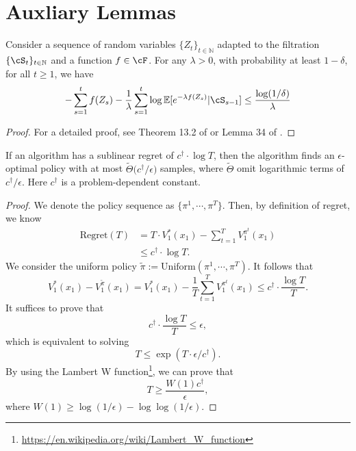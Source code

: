 \documentclass[11pt]{article}
\newcommand{\E}{\mathbb E}
\begin{document}
\section{Auxliary Lemmas}

\begin{lemma}\label{lm:th13_9}
Consider a sequence of random variables $\{Z_t\}_{t\in\mathbb N}$ adapted to the filtration $\{\cS_t\}_{t\in\mathbb N}$ and a function $f\in\cF$. For any $\lambda>0$, with probability at least $1-\delta$, for all $t\ge1$, we have
$$
-\sum_{s=1}^tf(Z_s)-\frac{1}{\lambda}\sum_{s=1}^t\log\E[e^{-\lambda f(Z_s)}|\cS_{s-1}]\le \frac{\log(1/\delta)}{\lambda} 
$$
\end{lemma}
\begin{proof}
For a detailed proof, see Theorem 13.2 of \citet{zhang2023mathematical} or Lemma 34 of \citet{foster2023foundations}.
\end{proof}

\begin{lemma} \label{lem:online2batch}
If an algorithm has a sublinear regret of $c^\dagger \cdot \log T $, then the algorithm finds an $\epsilon$-optimal policy with at most $\widetilde\Theta\big(c^\dagger / \epsilon\big)$ samples, where $\widetilde\Theta$ omit logarithmic terms of $c^\dagger/\epsilon$. Here $c^\dagger$ is a problem-dependent constant. 
\end{lemma}
\begin{proof}
        We denote the policy sequence as $\{\pi^1,\cdots,\pi^T\}$. Then, by definition of regret, we know 
    $$
    \begin{aligned}
        \mathrm{Regret}(T) &= T \cdot V_1^*(x_1) - \sum_{t=1}^T V_1^{\pi^t}(x_1)\\
        &\leq c^\dagger \cdot \log T.
    \end{aligned}
    $$
    We consider the uniform policy $\tilde{\pi} := \mathrm{Uniform}(\pi^1, \cdots, \pi^T)$. It follows that 
$$
V^*_1(x_1) - V^{\tilde{\pi}}_1(x_1) = V^*_1(x_1) - \frac{1}{T} \sum_{t=1}^T V_1^{\pi^t}(x_1) \leq c^\dagger \cdot \frac{\log T}{T}.
$$
It suffices to prove that
$$
c^\dagger \cdot \frac{\log T}{T} \le \epsilon,
$$
which is equivalent to solving
$$
T \le \exp(T\cdot \epsilon/c^\dagger).
$$
By using the Lambert W function\footnote{\url{https://en.wikipedia.org/wiki/Lambert_W_function}}, we can prove that
$$
T \ge \frac{W(1)c^\dagger}{\epsilon},
$$
where $W(1)\ge \log (1/\epsilon) - \log\log (1/\epsilon)$.

\end{proof}
\end{document}
